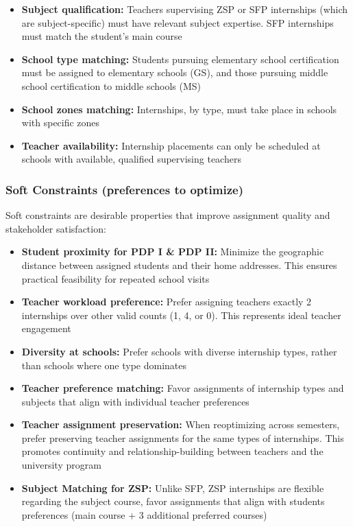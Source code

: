 \documentclass[12pt,a4paper]{report}
\begin{document}
\begin{itemize}
    \item \textbf{Subject qualification:} Teachers supervising ZSP or SFP internships (which are subject-specific) must have relevant subject expertise. SFP internships must match the student's main course 
    
    \item \textbf{School type matching:} Students pursuing elementary school certification must be assigned to elementary schools (GS), and those pursuing middle school certification to middle schools (MS)

    \item \textbf{School zones matching:} Internships, by type, must take place in schools with specific zones

    \item \textbf{Teacher availability:} Internship placements can only be scheduled at schools with available, qualified supervising teachers
\end{itemize}

\subsubsection{Soft Constraints (preferences to optimize)}

Soft constraints are desirable properties that improve assignment quality and stakeholder satisfaction:

\begin{itemize}
    \item \textbf{Student proximity for PDP I \& PDP II:} Minimize the geographic distance between assigned students and their home addresses. This ensures practical feasibility for repeated school visits
    
    \item \textbf{Teacher workload preference:} Prefer assigning teachers exactly 2 internships over other valid counts (1, 4, or 0). This represents ideal teacher engagement
    
    \item \textbf{Diversity at schools:} Prefer schools with diverse internship types, rather than schools where one type dominates
    
    \item \textbf{Teacher preference matching:} Favor assignments of internship types and subjects that align with individual teacher preferences
    
    \item \textbf{Teacher assignment preservation:} When reoptimizing across semesters, prefer preserving teacher assignments for the same types of internships. This promotes continuity and relationship-building between teachers and the university program

    \item \textbf{Subject Matching for ZSP:} Unlike SFP, ZSP internships are flexible regarding the subject course, favor assignments that align with students preferences (main course + 3 additional preferred courses)
\end{itemize}
\end{document}
